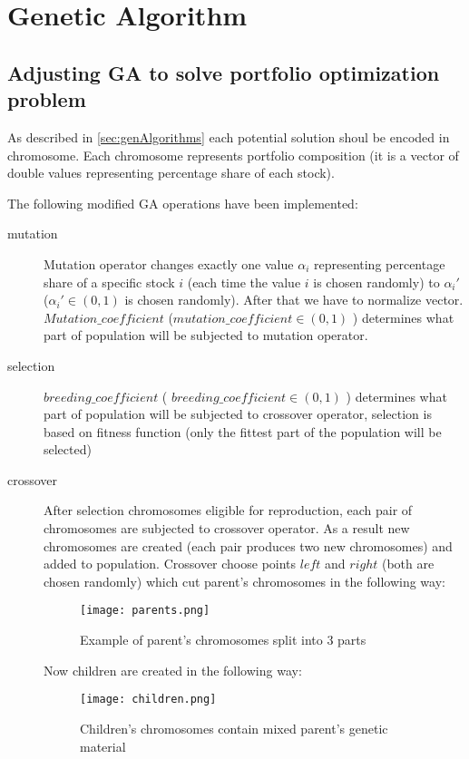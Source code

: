 \section{Genetic Algorithm}
\label{sec:genAlgoImpl}

\subsection{Adjusting GA to solve portfolio optimization problem}

As described in \ref{sec:genAlgorithms} each potential solution shoul be encoded in chromosome. 
Each chromosome represents portfolio composition (it is a vector of double values representing percentage share of each stock).

The following modified GA operations have been implemented:
\begin{description}
  \item [mutation]
      Mutation operator changes exactly one value $ \alpha_{i} $ representing percentage share of a specific stock $i$ (each time the value $i$ is chosen randomly)
      to $\alpha_{i}'$ ($\alpha_{i}' \in (0,1)$ is chosen randomly). 
      After that we have to normalize vector.
      $Mutation\_coefficient$ ($mutation\_coefficient \in (0,1)$ ) determines what part of population will be subjected to mutation operator.
  \item [selection]
      $breeding\_coefficient$ ( $breeding\_coefficient \in (0,1)$ ) determines what part of population will be subjected to crossover operator, selection is based on 
      fitness function (only the fittest part of the population will be selected)
  \item [crossover]
      After selection chromosomes eligible for reproduction, each pair of chromosomes are subjected to crossover operator. As a result new chromosomes are created (each pair
      produces two new chromosomes) and added to population. Crossover choose points $left$  and $right$ (both are chosen randomly) which cut parent's chromosomes in the following
      way: 
	  \begin{figure}[H]
	    \begin{center}
	      \texttt{[image: parents.png]}
	    \end{center}
	    \caption{Example of parent's chromosomes split into 3 parts}
	  \end{figure}

	Now children are created in the following way:    
	  \begin{figure}[H]
	    \begin{center}
	      \texttt{[image: children.png]}
	    \end{center}
	    \caption{Children's chromosomes contain mixed parent's genetic material}
	  \end{figure}

\end{description}

